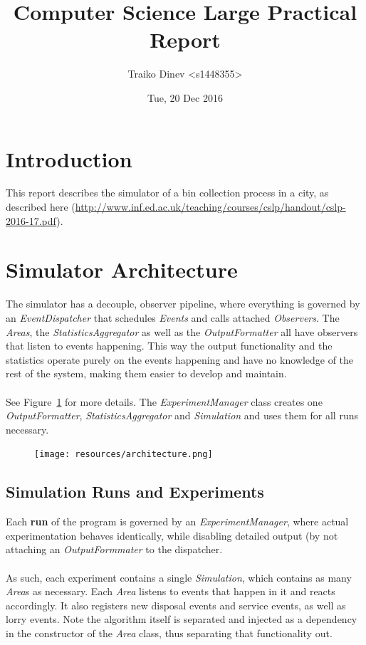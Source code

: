 \documentclass{article}
\title{Computer Science Large Practical Report}
\date{Tue, 20 Dec 2016}
\author{Traiko Dinev \textless s1448355\textgreater}
\begin{document}
	\maketitle

    \section{Introduction}
		This report describes the simulator of a bin collection process in a city, as described here (\url{http://www.inf.ed.ac.uk/teaching/courses/cslp/handout/cslp-2016-17.pdf}).
	
	\section{Simulator Architecture}
		The simulator has a decouple, observer pipeline, where everything is governed by an \textit{EventDispatcher} that schedules
		\textit{Events} and calls attached \textit{Observers}. The \textit{Areas}, the \textit{StatisticsAggregator} as well as the
		\textit{OutputFormatter} all have observers that listen to events happening. This way the output functionality and the statistics
		operate purely on the events happening and have no knowledge of the rest of the system, making them easier to develop and maintain.
		\\ \\
		See Figure~\ref{fig:fig1} for more details. The \textit{ExperimentManager} class creates one \textit{OutputFormatter}, \textit{StatisticsAggregator}
		and \textit{Simulation} and uses them for all runs necessary.

		\begin{figure}[H]
		\centering
			\texttt{[image: resources/architecture.png]}
			\label{fig:fig1} 
		\end{figure}

	\subsection{Simulation Runs and Experiments}
		Each \textbf{run} of the program is governed by an \textit{ExperimentManager}, where actual experimentation behaves identically, while
		disabling detailed output (by not attaching an \textit{OutputFormmater} to the dispatcher.
		\\
		\\
		As such, each experiment contains a single \textit{Simulation}, which contains as many \textit{Area}s as necessary.
		Each \textit{Area} listens to events that happen in it and reacts accordingly. It also registers new disposal events and service events,
		as well as lorry events. Note the algorithm itself is separated and injected as a dependency in the constructor of the \textit{Area} class, thus
		separating that functionality out.
\end{document}

